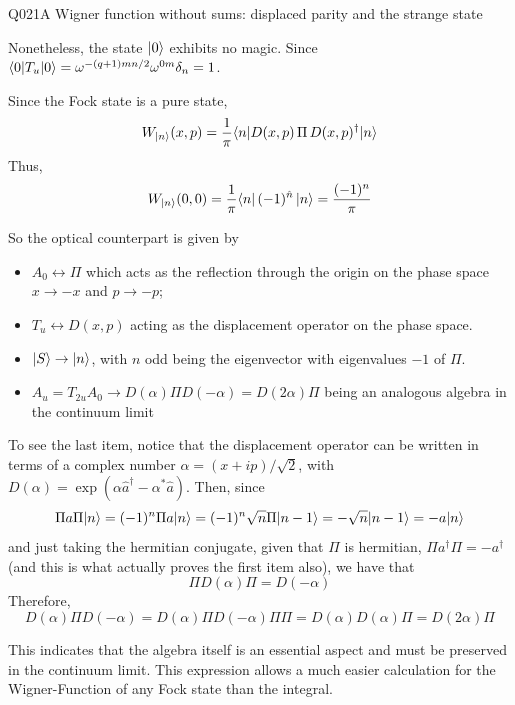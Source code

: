 \begin{entry}{Q021}{A Wigner function without sums: displaced parity and the strange state}
\begin{solution}[b]
Nonetheless, the state $\lvert 0 \rangle$ exhibits no magic. Since $\langle 0 \vert T_u \vert 0 \rangle=  \omega^{-(q+1)mn/2} \omega^{0m} \delta_{n}=1$. 

\end{solution}

\begin{solution}[c]
Since the Fock state is a pure state,
\begin{equation}
    W_{\lvert n \rangle}(x,p) = \frac{1}{\pi} \langle n \vert D(x,p)\,\Pi\,D(x,p)^{\dagger} \vert n \rangle
\end{equation}
Thus,
\begin{equation}
    W_{\lvert n \rangle}(0,0) = \frac{1}{\pi} \langle n \vert \,(-1)^{\hat n}\, \vert n \rangle = \frac{(-1)^n}{\pi}
\end{equation}

So the optical counterpart is given by 
\begin{itemize}
    \item $A_0 \leftrightarrow \Pi$ which acts as the reflection through the origin on the phase space $x \rightarrow -x$ and $p \rightarrow -p$;
    \item  $T_u \leftrightarrow D(x,p)$ acting as the displacement operator on the phase space.
    \item  $\lvert S \rangle \rightarrow \lvert n \rangle$, with $n$ odd being the eigenvector with eigenvalues $-1$ of $\Pi$. 
    \item  $A_u=T_{2u}A_0 \rightarrow D(\alpha)\Pi D(-\alpha)=D(2\alpha)\Pi$ being an analogous algebra in the continuum limit
\end{itemize}

To see the last item, notice that the displacement operator can be written in terms of a complex number $\alpha = (x+ip)/\sqrt{2}$, with $D(\alpha)=\exp(\alpha \hat a^\dagger -\alpha^*\hat a)$. Then, since 
\begin{equation*}
    \Pi a\Pi \lvert n \rangle = (-1)^n \Pi a \lvert n \rangle= (-1)^n \sqrt{n} \Pi  \lvert n-1 \rangle= -\sqrt{n}\lvert n-1 \rangle=-a\lvert n \rangle
\end{equation*}
and just taking the hermitian conjugate, given that $\Pi$ is hermitian, $\Pi a^\dagger \Pi= -a^\dagger$ (and this is what actually proves the first item also), we have that 
\begin{equation*}
    \Pi D(\alpha)\Pi= D(-\alpha)
\end{equation*}
Therefore, $$D(\alpha)\Pi D(-\alpha)=D(\alpha)\Pi D(-\alpha)\Pi\Pi=D(\alpha)D(\alpha)\Pi=D(2\alpha)\Pi$$

This indicates that the algebra itself is an essential aspect and must be preserved in the continuum limit. This expression allows a much easier calculation for the Wigner-Function of any Fock state than the integral.


\end{solution}
\end{entry}
